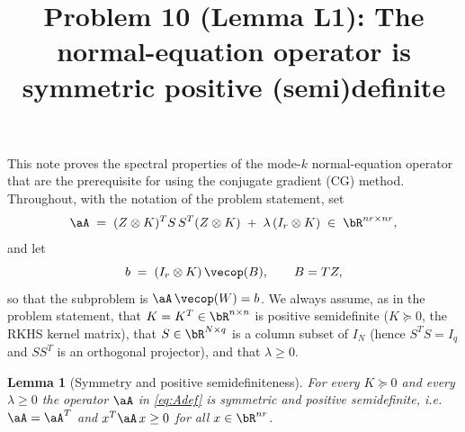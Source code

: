 
\usepackage{amsthm}
\newtheorem{lemma}{Lemma}
\newtheorem{theorem}{Theorem}
\newtheorem{remark}{Remark}

\title{Problem 10 (Lemma L1): The normal-equation operator is symmetric positive (semi)definite}
\date{}


\maketitle

\noindent
This note proves the spectral properties of the mode-$k$ normal-equation
operator that are the prerequisite for using the conjugate gradient (CG)
method. Throughout, with the notation of the problem statement, set
\begin{equation}\label{eq:Adef}
  \aA \;=\; (Z\otimes K)^{T} S\, S^{T} (Z\otimes K)\;+\;\lambda\,(I_r\otimes K)
  \;\in\;\bR^{nr\times nr},
\end{equation}
and let
\begin{equation}\label{eq:rhs}
  b \;=\; (I_r\otimes K)\,\vecop(B),\qquad B = TZ,
\end{equation}
so that the subproblem is $\aA\,\vecop(W)=b$. We always assume, as in the
problem statement, that $K=K^{T}\in\bR^{n\times n}$ is positive semidefinite
($K\succeq0$, the RKHS kernel matrix), that $S\in\bR^{N\times q}$ is a column
subset of $I_N$ (hence $S^{T}S=I_q$ and $SS^{T}$ is an orthogonal projector),
and that $\lambda\ge0$.

\bigskip

\begin{lemma}[Symmetry and positive semidefiniteness]\label{lem:psd}
For every $K\succeq0$ and every $\lambda\ge0$ the operator $\aA$ in
\eqref{eq:Adef} is symmetric and positive semidefinite, i.e.
$\aA=\aA^{T}$ and $x^{T}\aA\,x\ge0$ for all $x\in\bR^{nr}$.
\end{lemma}

